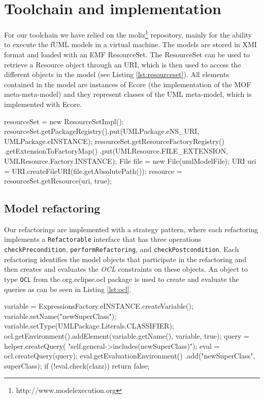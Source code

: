 \documentclass{llncs}
\begin{document}
\clearpage
\section{Toolchain and implementation}
\label{sec:toolchain}
For our toolchain we have relied on the moliz\footnote{http://www.modelexecution.org} repository, mainly for the ability to execute the fUML 
models in a virtual machine. The models are stored in XMI format and loaded with an EMF ResourceSet. The ResourceSet
can be used to retrieve a Resource object through an URI, which is then used to access the different objects in the model 
(see Listing \ref{lst:resourceset}). All elements contained in the model are instances of Ecore (the implementation of
the MOF meta-meta-model) and they represent classes of the UML meta-model, which is implemented with Ecore.

\begin{lstsingle}[language=Java,caption=Getting the resourceset,label=lst:resourceset]
resourceSet = new ResourceSetImpl();
resourceSet.getPackageRegistry().put(UMLPackage.eNS_URI,
                                     UMLPackage.eINSTANCE);
resourceSet.getResourceFactoryRegistry()
    .getExtensionToFactoryMap()
    .put(UMLResource.FILE_EXTENSION,
         UMLResource.Factory.INSTANCE);
File file = new File(umlModelFile);
URI uri = URI.createFileURI(file.getAbsolutePath());
    resource = resourceSet.getResource(uri, true);
\end{lstsingle}

\subsection{Model refactoring}
Our refactorings are implemented with a strategy pattern, where each refactoring implements a \texttt{Refactorable}
interface that has three operations \texttt{checkPrecondition}, \texttt{performRefactoring}, and \texttt{checkPostcondition}. 
Each refactoring identifies the model objects that participate in the refactoring and then creates and evaluates the \textit{OCL} 
constraints on these objects. An object to type \texttt{OCL} from the org.eclipse.ocl package is used to create and evaluate the 
queries as can be seen in Listing \ref{lst:ocl}.

\begin{lstsingle}[language=Java,caption=OCL validation in Java,label=lst:ocl]
variable = ExpressionsFactory.eINSTANCE.createVariable();
variable.setName("newSuperClass");
variable.setType(UMLPackage.Literals.CLASSIFIER);
ocl.getEnvironment().addElement(variable.getName(),
                                variable, true);
query = helper.createQuery(
    "self.general->includes(newSuperClass)");
eval = ocl.createQuery(query);
eval.getEvaluationEnvironment()
    .add("newSuperClass", superClass);
if (!eval.check(clazz))
    return false;
\end{lstsingle}
\end{document}
